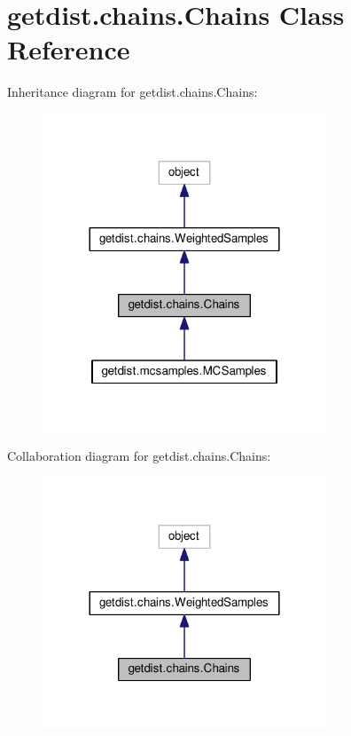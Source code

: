 \hypertarget{classgetdist_1_1chains_1_1Chains}{}\section{getdist.\+chains.\+Chains Class Reference}
\label{classgetdist_1_1chains_1_1Chains}


Inheritance diagram for getdist.\+chains.\+Chains\+:
\nopagebreak
\begin{figure}[H]
\begin{center}
\leavevmode
\includegraphics[width=240pt]{classgetdist_1_1chains_1_1Chains__inherit__graph}
\end{center}
\end{figure}


Collaboration diagram for getdist.\+chains.\+Chains\+:
\nopagebreak
\begin{figure}[H]
\begin{center}
\leavevmode
\includegraphics[width=240pt]{classgetdist_1_1chains_1_1Chains__coll__graph}
\end{center}
\end{figure}
